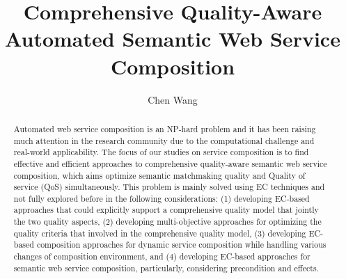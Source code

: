 \documentclass[11pt
              , a4paper
              , twoside
              , openright
              ]{report}
\title{Comprehensive Quality-Aware Automated Semantic Web Service Composition}
\author{Chen Wang}
\begin{document}
\frontmatter



\begin{abstract}
Automated web service composition is an NP-hard problem and it has been raising much attention in the research community due to the computational challenge and real-world applicability. The focus of our studies on service composition is to find effective and efficient approaches to comprehensive quality-aware semantic web service composition, which aims optimize semantic matchmaking quality and Quality of service (QoS) simultaneously. This problem is mainly solved using EC techniques and not fully explored before in the following considerations: (1) developing EC-based approaches that could explicitly support a comprehensive quality model that jointly the two quality aspects, (2) developing multi-objective approaches for optimizing the quality criteria that involved in the comprehensive quality model, (3) developing EC-based  composition approaches for dynamic service composition while handling various changes of composition environment, and  (4) developing EC-based approaches for semantic web service composition, particularly, considering precondition and effects.
\end{abstract}


\maketitle

%

\tableofcontents



\mainmatter








\backmatter





\end{document}
